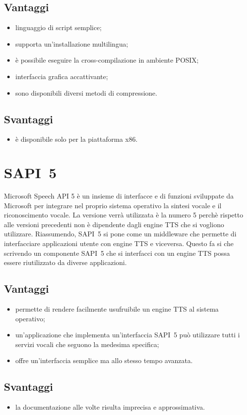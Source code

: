 \subsection*{Vantaggi}
\begin{itemize}
	\item linguaggio di script semplice;
	\item supporta un'installazione multilingua;
	\item è possibile eseguire la cross-compilazione in ambiente POSIX;
	\item interfaccia grafica accattivante;
	\item sono disponibili diversi metodi di compressione.
\end{itemize}
\subsection*{Svantaggi}
\begin{itemize}
	\item è disponibile solo per la piattaforma x86.
\end{itemize}
\section{SAPI~5}
Microsoft Speech API 5 è un insieme di interfacce e di funzioni sviluppate da Microsoft per integrare nel proprio sistema operativo la sintesi vocale e il riconoscimento vocale. La versione verrà utilizzata è la numero 5 perchè rispetto alle versioni precedenti non è dipendente dagli engine TTS che si vogliono utilizzare. Riassumendo, SAPI~5 si pone come un middleware che permette di interfacciare applicazioni utente con engine TTS e viceversa. Questo fa si che scrivendo un componente SAPI~5 che si interfacci con un engine TTS possa essere riutilizzato da diverse applicazioni.
\subsection*{Vantaggi}
\begin{itemize}
	\item permette di rendere facilmente usufruibile un engine TTS al sistema operativo;
	\item un'applicazione che implementa un'interfaccia SAPI~5 può utilizzare tutti i servizi vocali che seguono la medesima specifica;
	\item offre un'interfaccia semplice ma allo stesso tempo avanzata.
\end{itemize}
\subsection*{Svantaggi}
\begin{itemize}
	\item la documentazione alle volte risulta imprecisa e approssimativa.
\end{itemize}
